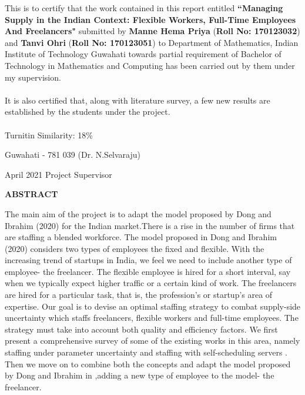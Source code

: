 \documentclass[12pt,a4wide]{report}
\theoremstyle{plain}
\theoremstyle{definition}
\theoremstyle{remark}
\begin{document}
\noindent
This is to certify that the work contained in this report
entitled {\textbf{``Managing Supply in the Indian Context:
Flexible Workers, Full-Time Employees And Freelancers"}} submitted by \textbf{Manne Hema Priya}
(\textbf{Roll No: 170123032}) and \textbf{Tanvi Ohri}
(\textbf{Roll No: 170123051}) to Department of Mathematics, Indian Institute of Technology
Guwahati towards partial requirement of Bachelor of Technology in
Mathematics and Computing has been carried out by them under my
supervision. \\ \\%
It is also certified that, along with literature survey, a few new results are established by the students under the project.\\ \\
Turnitin Similarity:  18\%

\vspace{4cm}

\noindent Guwahati - 781 039 \hfill (Dr. N.Selvaraju)

\noindent April 2021 \hfill Project Supervisor

\clearpage

\begin{center}
{\Large{\bf{ABSTRACT}}}
\end{center}


The main aim of the project is to adapt the model proposed by Dong and Ibrahim (2020) \cite{dong} for the Indian market.There is a rise in the number of firms that are staffing a blended workforce. The model proposed in Dong and Ibrahim (2020) \cite{dong} considers two types of employees the fixed and flexible. With the increasing trend of startups in India, we feel we need to include another type of employee- the freelancer. The flexible employee is hired for a short interval, say when we typically expect higher traffic or a certain kind of work. The freelancers are hired for a particular task, that is, the profession's or startup's area of expertise. Our goal is to devise an optimal staffing strategy to combat supply-side uncertainty which staffs freelancers, flexible workers and full-time employees. The strategy must take into account both quality and efficiency factors. We first present a comprehensive survey of some of the existing works in this area, namely staffing under parameter uncertainty \cite{bassamboo} and staffing with self-scheduling servers \cite{ibrahim}. Then we move on to combine both the concepts and adapt the model proposed by Dong and Ibrahim in \cite{dong} ,adding a new type of employee to the model- the freelancer.
\end{document}
